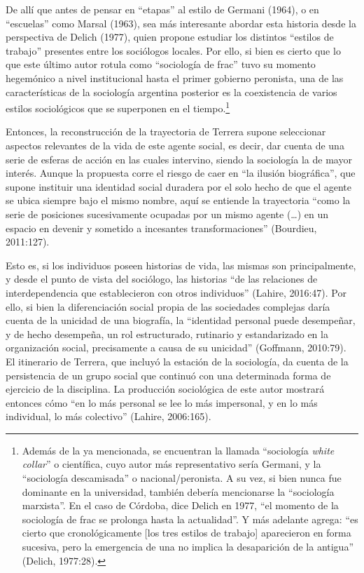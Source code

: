 De allí que antes de pensar en \enquote{etapas} al estilo de Germani (1964), o en \enquote{escuelas} como Marsal (1963), sea más interesante abordar esta historia desde la perspectiva de Delich (1977), quien propone estudiar los distintos \enquote{estilos de trabajo} presentes entre los sociólogos locales. Por ello, si bien es cierto que lo que este último autor rotula como \enquote{sociología de frac} tuvo su momento hegemónico a nivel institucional hasta el primer gobierno peronista, una de las características de la sociología argentina posterior es la coexistencia de varios estilos sociológicos que se superponen en el tiempo.\footnote{Además de la ya mencionada, se encuentran la llamada \enquote{sociología \emph{white collar}} o científica, cuyo autor más representativo sería Germani, y la \enquote{sociología descamisada} o nacional/peronista. A su vez, si bien nunca fue dominante en la universidad, también debería mencionarse la \enquote{sociología marxista}. En el caso de Córdoba, dice Delich en 1977, \enquote{el momento de la sociología de frac se prolonga hasta la actualidad}. Y más adelante agrega: \enquote{es cierto que cronológicamente [los tres estilos de trabajo] aparecieron en forma sucesiva, pero la emergencia de una no implica la desaparición de la antigua} (Delich, 1977:28).}

Entonces, la reconstrucción de la trayectoria de Terrera supone seleccionar aspectos relevantes de la vida de este agente social, es decir, dar cuenta de una serie de esferas de acción en las cuales intervino, siendo la sociología la de mayor interés. Aunque la propuesta corre el riesgo de caer en \enquote{la ilusión biográfica}, que supone instituir una identidad social duradera por el solo hecho de que el agente se ubica siempre bajo el mismo nombre, aquí se entiende la trayectoria \enquote{como la serie de posiciones sucesivamente ocupadas por un mismo agente (\dots) en un espacio en devenir y sometido a incesantes transformaciones} (Bourdieu, 2011:127).

Esto es, si los individuos poseen historias de vida, las mismas son principalmente, y desde el punto de vista del sociólogo, las historias \enquote{de las relaciones de interdependencia que establecieron con otros individuos} (Lahire, 2016:47). Por ello, si bien la diferenciación social propia de las sociedades complejas daría cuenta de la unicidad de una biografía, la \enquote{identidad personal puede desempeñar, y de hecho desempeña, un rol estructurado, rutinario y estandarizado en la organización social, precisamente a causa de su unicidad} (Goffmann, 2010:79). El itinerario de Terrera, que incluyó la estación de la sociología, da cuenta de la persistencia de un grupo social que continuó con una determinada forma de ejercicio de la disciplina. La producción sociológica de este autor mostrará entonces cómo \enquote{en lo más personal se lee lo más impersonal, y en lo más individual, lo más colectivo} (Lahire, 2006:165).

